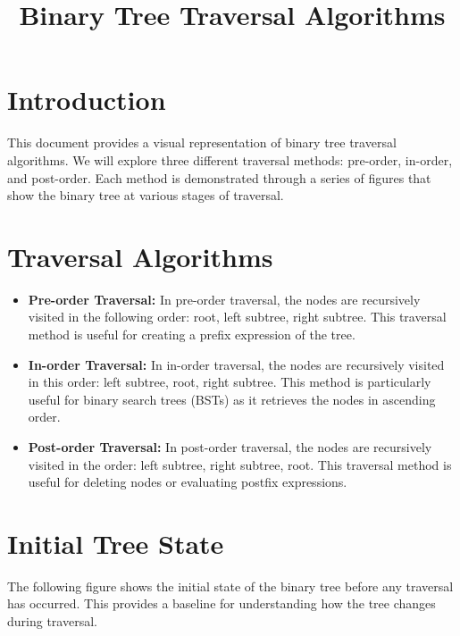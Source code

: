 \documentclass[10pt,a4paper]{article}
\begin{document}
\title{Binary Tree Traversal Algorithms}
\author{}
\date{}
\maketitle

\section*{Introduction}
This document provides a visual representation of binary tree traversal algorithms. We will explore three different traversal methods: pre-order, in-order, and post-order. Each method is demonstrated through a series of figures that show the binary tree at various stages of traversal.

\section*{Traversal Algorithms}
\begin{itemize}
    \item \textbf{Pre-order Traversal:}
    In pre-order traversal, the nodes are recursively visited in the following order: root, left subtree, right subtree. This traversal method is useful for creating a prefix expression of the tree.
    
    \item \textbf{In-order Traversal:}
    In in-order traversal, the nodes are recursively visited in this order: left subtree, root, right subtree. This method is particularly useful for binary search trees (BSTs) as it retrieves the nodes in ascending order.
    
    \item \textbf{Post-order Traversal:}
    In post-order traversal, the nodes are recursively visited in the order: left subtree, right subtree, root. This traversal method is useful for deleting nodes or evaluating postfix expressions.
\end{itemize}

\section*{Initial Tree State}
The following figure shows the initial state of the binary tree before any traversal has occurred. This provides a baseline for understanding how the tree changes during traversal.
\end{document}
